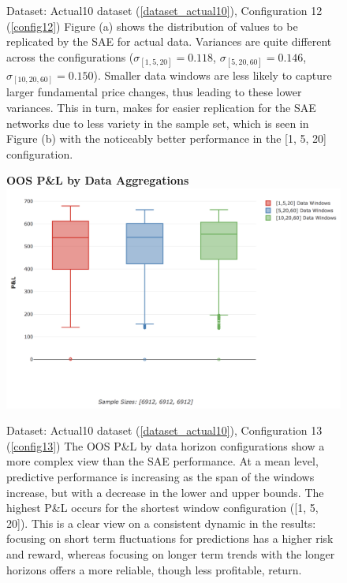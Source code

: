 \documentclass[a4paper,11pt,oneside]{article}
\theoremstyle{plain}
\theoremstyle{definition}
\begin{document}
\begin{figure}[H]
\begin{subfigure}{.5\textwidth}
			\label{figure-actual_aggregation_mse}
		\end{subfigure}
		\caption[SAE MSE Scores by Data Aggregations]
		{Dataset: Actual10 dataset (\ref{dataset_actual10}), Configuration 12 (\ref{config12})
			\newline Figure (a) shows the distribution of values to be replicated by the SAE for actual data. Variances are quite different across the configurations ($\sigma_{[1,5,20]} = 0.118$, $\sigma_{[5,20,60]} = 0.146$, $\sigma_{[10,20,60]} = 0.150$). Smaller data windows are less likely to capture larger fundamental price changes, thus leading to these lower variances. This in turn, makes for easier replication for the SAE networks due to less variety in the sample set, which is seen in Figure (b) with the noticeably better performance in the [1, 5, 20] configuration.}
		\label{fig_data_sae_actual}
	\end{figure}
	
	
	
		\begin{figure}[H]
		\centering 
		\textbf{OOS P\&L by Data Aggregations}
		\includegraphics[scale=0.4]{images/results/data/actual_aggregation_pl.png}
		\caption[OOS P\&L by Data Aggregations]
		{
			Dataset: Actual10 dataset (\ref{dataset_actual10}), Configuration 13 (\ref{config13})
			\newline The OOS P\&L by data horizon configurations show a more complex view than the SAE performance. At a mean level, predictive performance is increasing as the span of the windows increase, but with a decrease in the lower and upper bounds. The highest P\&L occurs for the shortest window configuration ([1, 5, 20]). This is a clear view on a consistent dynamic in the results: focusing on short term fluctuations for predictions has a higher risk and reward, whereas focusing on longer term trends with the longer horizons offers a more reliable, though less profitable, return.}
		\label{figure-actual_aggregation_pl}
	\end{figure}
	
\end{document}
